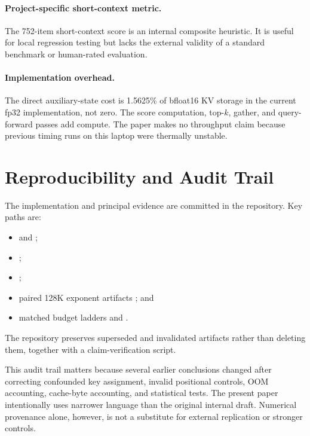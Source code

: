 \documentclass[10pt,twocolumn]{article}
\begin{document}
\paragraph{Project-specific short-context metric.}
The 752-item short-context score is an internal composite heuristic. It is useful for local regression testing but lacks the external validity of a standard benchmark or human-rated evaluation.

\paragraph{Implementation overhead.}
The direct auxiliary-state cost is 1.5625\% of bfloat16 KV storage in the current fp32 implementation, not zero. The score computation, top-$k$, gather, and query-forward passes add compute. The paper makes no throughput claim because previous timing runs on this laptop were thermally unstable.

\section{Reproducibility and Audit Trail}
The implementation and principal evidence are committed in the repository. Key paths are:
\begin{itemize}[leftmargin=*,nosep]
    \item {} and ;
    \item {};
    \item {};
    \item paired 128K exponent artifacts ; and
    \item matched budget ladders  and .
\end{itemize}
The repository preserves superseded and invalidated artifacts rather than deleting them, together with a claim-verification script.

This audit trail matters because several earlier conclusions changed after correcting confounded key assignment, invalid positional controls, OOM accounting, cache-byte accounting, and statistical tests. The present paper intentionally uses narrower language than the original internal draft. Numerical provenance alone, however, is not a substitute for external replication or stronger controls.
\end{document}

